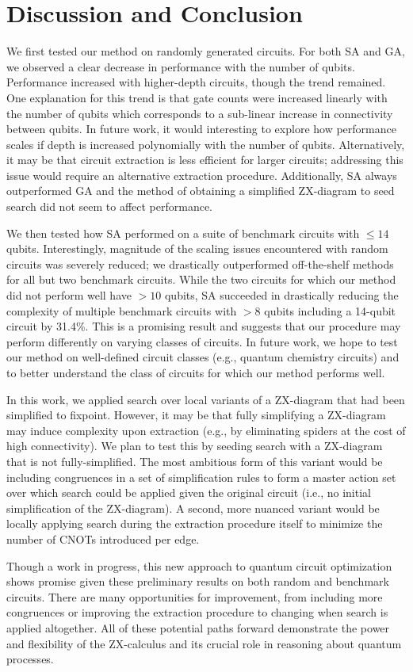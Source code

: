 \chapter[Discussion and Conclusion]{Discussion and Conclusion} \label{ch:discuss-conc}

We first tested our method on randomly generated circuits.
For both SA and GA, we observed a clear decrease in performance with the number of qubits.
Performance increased with higher-depth circuits, though the trend remained.
One explanation for this trend is that gate counts were increased linearly with the number of qubits which corresponds to a sub-linear increase in connectivity between qubits.
In future work, it would interesting to explore how performance scales if depth is increased polynomially with the number of qubits.
Alternatively, it may be that circuit extraction is less efficient for larger circuits;
addressing this issue would require an alternative extraction procedure.
Additionally, SA always outperformed GA and the method of obtaining a simplified ZX-diagram to seed search did not seem to affect performance.

We then tested how SA performed on a suite of benchmark circuits with $\leq 14$ qubits.
Interestingly, magnitude of the scaling issues encountered with random circuits was severely reduced;
we drastically outperformed off-the-shelf methods for all but two benchmark circuits.
While the two circuits for which our method did not perform well have $>10$ qubits, SA succeeded in drastically reducing the complexity of multiple benchmark circuits with $>8$ qubits including a 14-qubit circuit by 31.4\%.
This is a promising result and suggests that our procedure may perform differently on varying classes of circuits.
In future work, we hope to test our method on well-defined circuit classes (e.g., quantum chemistry circuits) and to better understand the class of circuits for which our method performs well.


In this work, we applied search over local variants of a ZX-diagram that had been simplified to fixpoint.
However, it may be that fully simplifying a ZX-diagram may induce complexity upon extraction (e.g., by eliminating spiders at the cost of high connectivity).
We plan to test this by seeding search with a ZX-diagram that is not fully-simplified.
The most ambitious form of this variant would be including congruences in a set of simplification rules to form a master action set over which search could be applied given the original circuit (i.e., no initial simplification of the ZX-diagram).
A second, more nuanced variant would be locally applying search during the extraction procedure itself to minimize the number of CNOTs introduced per edge.

Though a work in progress, this new approach to quantum circuit optimization shows promise given these preliminary results on both random and benchmark circuits.
There are many opportunities for improvement, from including more congruences or improving the extraction procedure to changing when search is applied altogether.
All of these potential paths forward demonstrate the power and flexibility of the ZX-calculus and its crucial role in reasoning about quantum processes.
